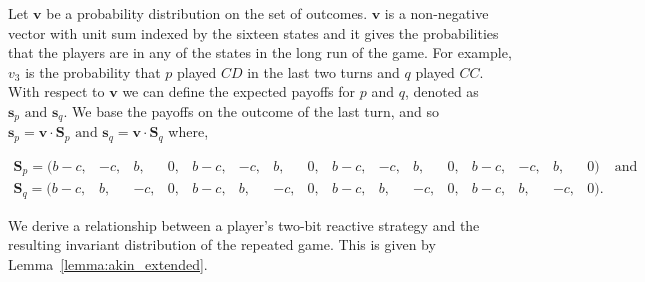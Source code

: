 \documentclass{article}
\theoremstyle{definition}
\begin{document}

Let \(\mathbf{v}\) be a probability distribution on the set of outcomes.
\(\mathbf{v}\) is a non-negative vector with unit sum indexed by the sixteen
states and it gives the probabilities that the players are in any
of the states in the long run of the game. For example, \(v_3\) is the
probability that \(p\) played \(CD\) in the last two turns and \(q\) played
\(CC\). With respect to \(\mathbf{v}\) we can define the expected payoffs for
\(p\) and \(q\), denoted as \(\mathbf{s}_{p} \text{ and } \mathbf{s}_{q}\). We
base the payoffs on the outcome of the last turn, and so \(\mathbf{s}_{p} =
\mathbf{v} \cdot \mathbf{S}_{p} \text{ and } \mathbf{s}_{q} = \mathbf{v} \cdot
\mathbf{S}_{q} \) where,

\vspace{-.5cm}

\begin{equation}\label{eq:last_round_two_bits}
\begin{array}{*{17}{c}}
  \mathbf{S}_{p} = ( b\!-\!c , & -c , & b , & 0 , & b\!-\!c , & -c , & b , & 0 , & b\!-\!c , & -c , & b , & 0 , & b\!-\!c , & -c , & b , & 0) & \text{and} \\
  \mathbf{S}_{q} = ( b\!-\!c, & b, & -c, & 0, & b\!-\!c, & b, & -c, & 0, & b\!-\!c, & b, & -c, & 0, & b\!-\!c, & b, & -c, & 0). &
\end{array}
\end{equation}

We derive a relationship between a player's  two-bit reactive strategy and the
resulting invariant distribution of the repeated game. This is given by
Lemma~\ref{lemma:akin_extended}.
\end{document}
